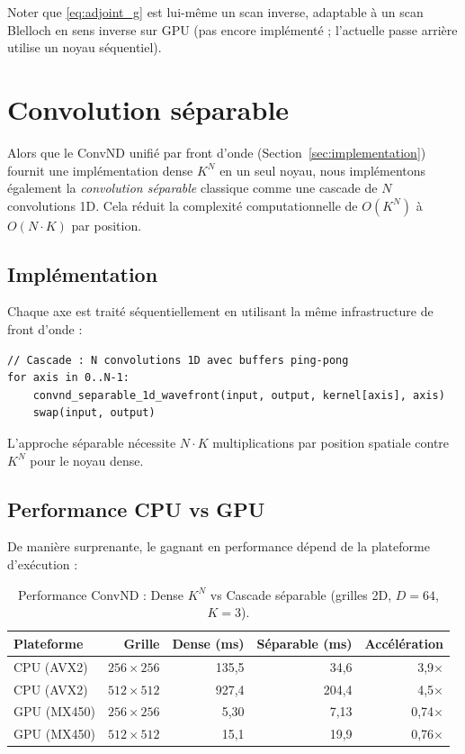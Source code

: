 \documentclass[10pt,onecolumn]{article}
\begin{document}
Noter que \eqref{eq:adjoint_g} est lui-même un scan inverse, adaptable à
un scan Blelloch en sens inverse sur GPU (pas encore implémenté ;
l'actuelle passe arrière utilise un noyau séquentiel).

\section{Convolution séparable}
\label{sec:separable}

Alors que le ConvND unifié par front d'onde (Section~\ref{sec:implementation}) fournit
une implémentation dense $K^N$ en un seul noyau, nous implémentons également la
\emph{convolution séparable} classique comme une cascade de $N$ convolutions 1D.
Cela réduit la complexité computationnelle de $O(K^N)$ à $O(N \cdot K)$ par position.

\subsection{Implémentation}

Chaque axe est traité séquentiellement en utilisant la même infrastructure de front d'onde :

\begin{verbatim}
// Cascade : N convolutions 1D avec buffers ping-pong
for axis in 0..N-1:
    convnd_separable_1d_wavefront(input, output, kernel[axis], axis)
    swap(input, output)
\end{verbatim}

L'approche séparable nécessite $N \cdot K$ multiplications par position spatiale
contre $K^N$ pour le noyau dense.

\subsection{Performance CPU vs GPU}

De manière surprenante, le gagnant en performance dépend de la plateforme d'exécution :

\begin{table}[htbp]
\centering
\caption{Performance ConvND : Dense $K^N$ vs Cascade séparable (grilles 2D, $D{=}64$, $K{=}3$).}
\label{tab:convnd}
\begin{tabular}{lrrrr}
\toprule
Plateforme & Grille & Dense (ms) & Séparable (ms) & Accélération \\
\midrule
CPU (AVX2) & $256 \times 256$ & 135,5 & 34,6 & 3,9$\times$ \\
CPU (AVX2) & $512 \times 512$ & 927,4 & 204,4 & 4,5$\times$ \\
GPU (MX450) & $256 \times 256$ & 5,30 & 7,13 & 0,74$\times$ \\
GPU (MX450) & $512 \times 512$ & 15,1 & 19,9 & 0,76$\times$ \\
\bottomrule
\end{tabular}
\end{table}
\end{document}

